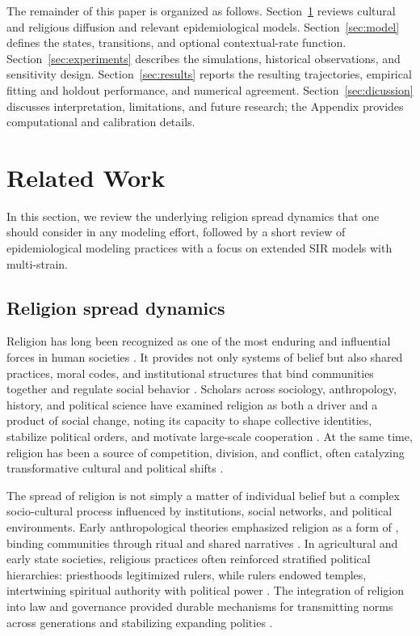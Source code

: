 \documentclass[11pt,a4paper]{article}
\begin{document}
The remainder of this paper is organized as follows. Section~\ref{sec:rw} reviews cultural and religious diffusion and relevant epidemiological models. Section~\ref{sec:model} defines the states, transitions, and optional contextual-rate function. Section~\ref{sec:experiments} describes the simulations, historical observations, and sensitivity design. Section~\ref{sec:results} reports the resulting trajectories, empirical fitting and holdout performance, and numerical agreement. Section~\ref{sec:dicussion} discusses interpretation, limitations, and future research; the Appendix provides computational and calibration details.

\section{Related Work}
\label{sec:rw}
In this section, we review the underlying religion spread dynamics that one should consider in any modeling effort, followed by a short review of epidemiological modeling practices with a focus on extended SIR models with multi-strain. 

\subsection{Religion spread dynamics}
Religion has long been recognized as one of the most enduring and influential forces in human societies \cite{cretacci2003religion,ross1896social,kaasa2013religion}. It provides not only systems of belief but also shared practices, moral codes, and institutional structures that bind communities together and regulate social behavior \cite{rw_1}. Scholars across sociology, anthropology, history, and political science have examined religion as both a driver and a product of social change, noting its capacity to shape collective identities, stabilize political orders, and motivate large-scale cooperation \cite{rw_2,rw_3,rw_4,rw_5}. At the same time, religion has been a source of competition, division, and conflict, often catalyzing transformative cultural and political shifts \cite{rw_6,rw_7}.

The spread of religion is not simply a matter of individual belief but a complex socio-cultural process influenced by institutions, social networks, and political environments. Early anthropological theories emphasized religion as a form of , binding communities through ritual and shared narratives \cite{rw_8}. In agricultural and early state societies, religious practices often reinforced stratified political hierarchies: priesthoods legitimized rulers, while rulers endowed temples, intertwining spiritual authority with political power \cite{rw_9}. The integration of religion into law and governance provided durable mechanisms for transmitting norms across generations and stabilizing expanding polities \cite{haggard2010governance}.
\end{document}

